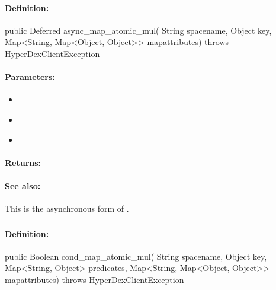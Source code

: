 \paragraph{Definition:}
\begin{javacode}
public Deferred async_map_atomic_mul(
        String spacename,
        Object key,
        Map<String, Map<Object, Object>> mapattributes) throws HyperDexClientException
\end{javacode}

\paragraph{Parameters:}
\begin{itemize}[noitemsep]
\item {}\\

\item {}\\

\item {}\\

\end{itemize}

\paragraph{Returns:}


\paragraph{See also:}  This is the asynchronous form of .

\pagebreak
\subsubsection{}
\label{api:java:cond_map_atomic_mul}


\paragraph{Definition:}
\begin{javacode}
public Boolean cond_map_atomic_mul(
        String spacename,
        Object key,
        Map<String, Object> predicates,
        Map<String, Map<Object, Object>> mapattributes) throws HyperDexClientException
\end{javacode}

